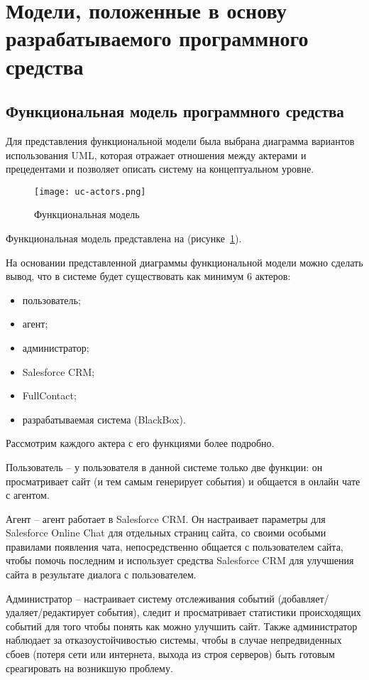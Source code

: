 \section{Модели, положенные в основу разрабатываемого программного средства}
\label{sec:models:intro}


\subsection{Функциональная модель программного средства}
\label{sub:models:func_model}

Для представления функциональной модели была выбрана диаграмма вариантов использования UML, которая отражает отношения между актерами и прецедентами и позволяет описать систему на концептуальном уровне.

\begin{figure}[ht]
\centering
  \texttt{[image: uc-actors.png]}  
  \caption{Функциональная модель}
	\label{fig:uc-actors}
\end{figure} 

Функциональная модель представлена на (рисунке~\ref{fig:uc-actors}).

На основании представленной диаграммы функциональной модели можно сделать вывод, что в системе будет существовать как минимум 6 актеров:
\begin{itemize}
\item пользователь;
\item агент;
\item администратор;
\item Salesforce CRM;
\item FullContact;
\item разрабатываемая система (BlackBox).
\end{itemize}
 
Рассмотрим каждого актера с его функциями более подробно.


Пользователь -- у пользователя в данной системе только две функции: он просматривает сайт (и тем самым генерирует события) и общается в онлайн чате с агентом.

Агент -- агент работает в Salesforce CRM. Он настраивает параметры для Salesforce Online Chat для отдельных страниц сайта, со своими особыми правилами появления чата, непосредственно общается с пользователем сайта, чтобы помочь последним и использует средства Salesforce CRM для улучшения сайта в результате диалога с пользователем.

Администратор -- настраивает систему отслеживания событий (добавляет/удаляет/редактирует события), следит и просматривает статистики происходящих событий для того чтобы понять как можно улучшить сайт. Также администратор наблюдает за отказоустойчивостью системы, чтобы в случае непредвиденных сбоев (потеря сети или интернета, выхода из строя серверов) быть готовым среагировать на возникшую проблему.

